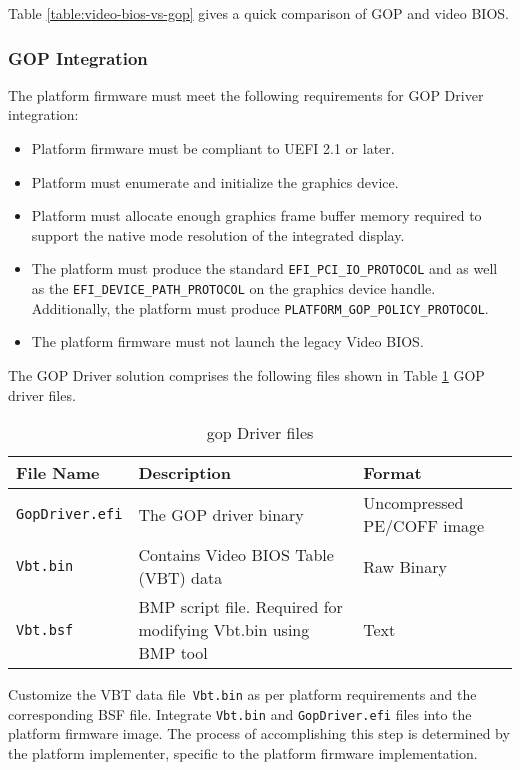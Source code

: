 Table \ref{table:video-bios-vs-gop} gives a quick comparison of GOP and video BIOS.


\subsubsection{GOP Integration}
The platform firmware must meet the following requirements for GOP Driver integration:
\begin{itemize}
	\item Platform firmware must be compliant to UEFI 2.1 or later.
	\item Platform must enumerate and initialize the graphics device.
	\item Platform must allocate enough graphics frame buffer memory required to support the native mode resolution of the integrated display.
	\item The platform must produce the standard \verb|EFI_PCI_IO_PROTOCOL| and as well as the \verb|EFI_DEVICE_PATH_PROTOCOL| on the graphics device handle. Additionally, the platform must produce \verb|PLATFORM_GOP_POLICY_PROTOCOL|.
	\item The platform firmware must not launch the legacy Video BIOS.
\end{itemize}

The GOP Driver solution comprises the following files shown in Table \ref{table:gop-driver-files} GOP driver files.

\begin{table}
	\centering
	\renewcommand\arraystretch{2}
	\caption{\gls{gop} Driver files}\label{table:gop-driver-files}
	\begin{tabular}{l | p{5cm} | p{5cm}}
		File Name & Description & Format
		\\ \hline \hline
		\verb|GopDriver.efi| & The GOP driver binary & Uncompressed PE/COFF image
		\\ \hline
		\verb|Vbt.bin| & Contains Video BIOS Table (VBT) data & Raw Binary
		\\ \hline
		\verb|Vbt.bsf| & BMP script file. Required for modifying Vbt.bin using BMP tool & Text
		\\ \hline
	\end{tabular}
\end{table}

Customize the VBT data file\verb| Vbt.bin| as per platform requirements and the corresponding BSF file. Integrate \verb|Vbt.bin| and \verb|GopDriver.efi| files into the platform firmware image. The process of accomplishing this step is determined by the platform implementer, specific to the platform firmware implementation.

